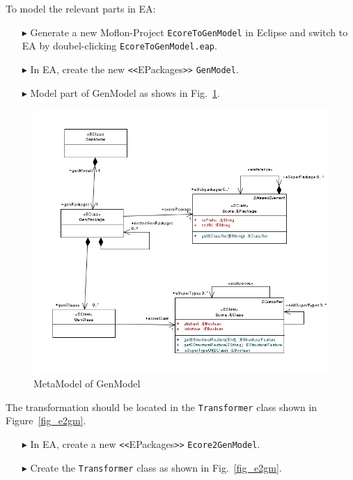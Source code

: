 To model the relevant parts in EA:
\begin{enumerate}
\item[$\blacktriangleright$]Generate a new Moflon-Project \texttt{EcoreToGenModel} in Eclipse and switch to EA by doubel-clicking \texttt{EcoreToGenModel.eap}.

\item[$\blacktriangleright$]In EA, create the new \texttt{<<}EPackages\texttt{>>} \texttt{GenModel}.

\item[$\blacktriangleright$]Model part of GenModel as shows in Fig.~\ref{fig_gMM}.
\end{enumerate}
\begin{figure}[htbp]
\begin{center}  \includegraphics[width=1.0\textwidth]{pics/Ecore2GenModel_Bilder/EA_genMETAmodel.png}
        \caption{MetaModel of GenModel}  
  \label{fig_gMM}
\end{center}
\end{figure} 



The transformation should be located in the \texttt{Transformer} class shown in Figure~\ref{fig_e2gm}. 
\begin{enumerate}
\item[$\blacktriangleright$]In EA, create a new \texttt{<<}EPackages\texttt{>>} \texttt{Ecore2GenModel}.

\item[$\blacktriangleright$]Create the \texttt{Transformer} class as shown in Fig.~\ref{fig_e2gm}.
\end{enumerate}


